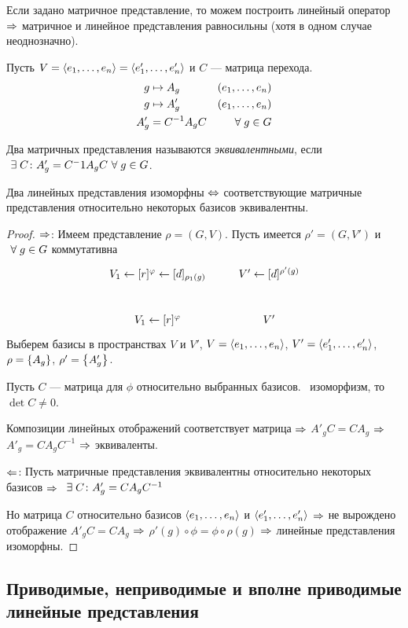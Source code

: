 Если задано матричное представление,
то можем построить линейный оператор $\Rightarrow$
матричное и линейное представления равносильны
(хотя в одном случае неоднозначно).

Пусть $V = \left\langle e_1 ,\ldots, e_n\right\rangle = \left\langle e'_1 ,\ldots, e'_n\right\rangle$ и $C$ --- матрица перехода.
\begin{align*}
	g &\mapsto A_g & \left(e_1 ,\ldots, e_n\right) \\
	g &\mapsto A'_g & \left(e_1 ,\ldots, e_n\right) \\
	A'_g & = C^{-1} A_g C & ~\forall\; g \in G
\end{align*}

\begin{df}
	Два матричных представления называются \textit{эквивалентными},
	если 
		$~\exists\; C \colon A'_g = C^-1 A_g C ~\forall\; g \in G$.
\end{df}

\begin{stm}
	Два линейных представления изоморфны $\Leftrightarrow$
	соответствующие матричные представления относительно некоторых базисов эквивалентны.
\end{stm}
\begin{proof}
	$\Rightarrow$: Имеем представление $\rho = (G, V)$.
	Пусть имеется $\rho' = (G, V')$ и $~\forall\; g \in G$ коммутативна
	$$
		\xymatrix{
				V_1 \ar[r]^{\phi} \ar[d]_{\rho_1(g)} & V' \ar[d]^{\rho'(g)} \\
				V_1 \ar[r]^{\phi} & V'
			}
	$$
	Выберем базисы в пространствах $V$ и $V'$,
	$V = \left\langle e_1 ,\ldots, e_n\right\rangle$, $V' = \left\langle e'_1 ,\ldots, e'_n\right\rangle$, $\rho = \left\{A_g\right\}$, $\rho' = \left\{A'_g\right\}$.

	Пусть $C$ --- матрица для $\phi$ относительно выбранных базисов.
	\Bt\ изоморфизм, то $\det C \ne 0$.

	Композиции линейных отображений соответствует матрица $\Rightarrow$
	$A'_g C = C A_g$ $\Rightarrow$ $A'_g = C A_g C^{-1}$ $\Rightarrow$ эквиваленты.

	$\Leftarrow$: Пусть матричные представления эквивалентны относительно некоторых базисов $\Rightarrow$
	$~\exists\; C \colon A'_g = C A_g C^{-1}$

	Но матрица $C$ относительно базисов $\left\langle e_1 ,\ldots, e_n\right\rangle$ и $\left\langle e'_1 ,\ldots, e'_n\right\rangle$ $\Rightarrow$
	не вырождено отображение $A'_g C = C A_g$ $\Rightarrow$ $\rho'(g) \circ \phi = \phi \circ \rho(g)$ $\Rightarrow$
	линейные представления изоморфны.
\end{proof}


\subsection{Приводимые, неприводимые и вполне приводимые линейные представления}

